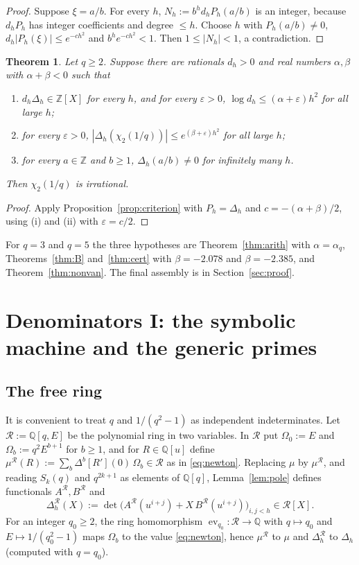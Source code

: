 \documentclass[11pt]{amsart}
\newtheorem{theorem}{Theorem}[section]
\theoremstyle{definition}
\theoremstyle{remark}
\numberwithin{equation}{section}
\newcommand{\ZZ}{\mathbb{Z}}
\newcommand{\QQ}{\mathbb{Q}}
\newcommand{\cR}{\mathcal{R}}
\newcommand{\eps}{\varepsilon}
\begin{document}
\begin{proof}
Suppose $\xi=a/b$. For every $h$, $N_h:=b^hd_hP_h(a/b)$ is an integer, because $d_hP_h$ has integer coefficients
and degree $\le h$. Choose $h$ with $P_h(a/b)\ne0$, $d_h|P_h(\xi)|\le e^{-ch^2}$ and $b^he^{-ch^2}<1$. Then
$1\le|N_h|<1$, a contradiction.
\end{proof}

\begin{theorem}\label{thm:conditional}
Let $q\ge2$. Suppose there are rationals $d_h>0$ and real numbers $\alpha,\beta$ with $\alpha+\beta<0$ such that
\begin{enumerate}
\item $d_h\Delta_h\in\ZZ[X]$ for every $h$, and for every $\eps>0$, $\log d_h\le(\alpha+\eps)h^2$ for all large $h$;
\item for every $\eps>0$, $|\Delta_h(\chi_2(1/q))|\le e^{(\beta+\eps)h^2}$ for all large $h$;
\item for every $a\in\ZZ$ and $b\ge1$, $\Delta_h(a/b)\ne0$ for infinitely many $h$.
\end{enumerate}
Then $\chi_2(1/q)$ is irrational.
\end{theorem}

\begin{proof}
Apply Proposition~\ref{prop:criterion} with $P_h=\Delta_h$ and $c=-(\alpha+\beta)/2$, using (i) and (ii) with
$\eps=c/2$.
\end{proof}

For $q=3$ and $q=5$ the three hypotheses are Theorem~\ref{thm:arith} with $\alpha=\alpha_q$,
Theorems~\ref{thm:B} and~\ref{thm:cert} with $\beta=-2.078$ and $\beta=-2.385$, and
Theorem~\ref{thm:nonvan}. The final assembly is in Section~\ref{sec:proof}.

\section{Denominators I: the symbolic machine and the generic primes}\label{sec:arith1}

\subsection{The free ring}\label{sec:free}
It is convenient to treat $q$ and $1/(q^2-1)$ as independent indeterminates. Let $\cR:=\QQ[q,E]$ be the polynomial
ring in two variables. In $\cR$ put $\Omega_0:=E$ and $\Omega_b:=q^2E^{b+1}$ for $b\ge1$, and for $R\in\QQ[u]$ define
$\mu^{\cR}(R):=\sum_b\Delta^b[R'](0)\,\Omega_b\in\cR$ as in \eqref{eq:newton}. Replacing $\mu$ by $\mu^{\cR}$, and
reading $S_k(q)$ and $q^{2k+1}$ as elements of $\QQ[q]$, Lemma~\ref{lem:pole} defines functionals $A^{\cR},B^{\cR}$ and
\[
  \Delta^{\cR}_h(X):=\det\bigl(A^{\cR}(u^{i+j})+X\,B^{\cR}(u^{i+j})\bigr)_{i,j<h}\in\cR[X].
\]
For an integer $q_0\ge2$, the ring homomorphism $\operatorname{ev}_{q_0}\colon\cR\to\QQ$ with $q\mapsto q_0$ and
$E\mapsto1/(q_0^2-1)$ maps $\Omega_b$ to the value \eqref{eq:newton}, hence $\mu^{\cR}$ to $\mu$ and
$\Delta^{\cR}_h$ to $\Delta_h$ (computed with $q=q_0$).
\end{document}
